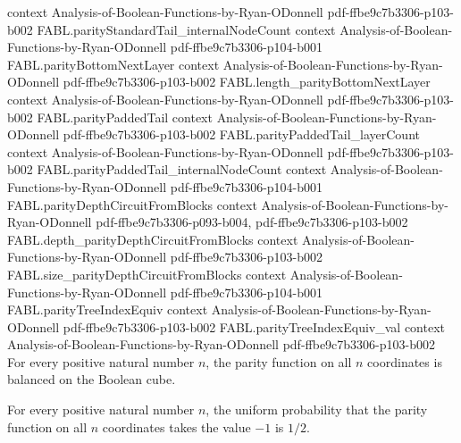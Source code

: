 \begin{theorem}
  {context}
  {Analysis-of-Boolean-Functions-by-Ryan-ODonnell}
  {pdf-ffbe9c7b3306-p103-b002}
\proofstep
  {FABL.parityStandardTail_internalNodeCount}
  {context}
  {Analysis-of-Boolean-Functions-by-Ryan-ODonnell}
  {pdf-ffbe9c7b3306-p104-b001}
\proofstep
  {FABL.parityBottomNextLayer}
  {context}
  {Analysis-of-Boolean-Functions-by-Ryan-ODonnell}
  {pdf-ffbe9c7b3306-p103-b002}
\proofstep
  {FABL.length_parityBottomNextLayer}
  {context}
  {Analysis-of-Boolean-Functions-by-Ryan-ODonnell}
  {pdf-ffbe9c7b3306-p103-b002}
\proofstep
  {FABL.parityPaddedTail}
  {context}
  {Analysis-of-Boolean-Functions-by-Ryan-ODonnell}
  {pdf-ffbe9c7b3306-p103-b002}
\proofstep
  {FABL.parityPaddedTail_layerCount}
  {context}
  {Analysis-of-Boolean-Functions-by-Ryan-ODonnell}
  {pdf-ffbe9c7b3306-p103-b002}
\proofstep
  {FABL.parityPaddedTail_internalNodeCount}
  {context}
  {Analysis-of-Boolean-Functions-by-Ryan-ODonnell}
  {pdf-ffbe9c7b3306-p104-b001}
\proofstep
  {FABL.parityDepthCircuitFromBlocks}
  {context}
  {Analysis-of-Boolean-Functions-by-Ryan-ODonnell}
  {pdf-ffbe9c7b3306-p093-b004,
    pdf-ffbe9c7b3306-p103-b002}
\proofstep
  {FABL.depth_parityDepthCircuitFromBlocks}
  {context}
  {Analysis-of-Boolean-Functions-by-Ryan-ODonnell}
  {pdf-ffbe9c7b3306-p103-b002}
\proofstep
  {FABL.size_parityDepthCircuitFromBlocks}
  {context}
  {Analysis-of-Boolean-Functions-by-Ryan-ODonnell}
  {pdf-ffbe9c7b3306-p104-b001}
\proofstep
  {FABL.parityTreeIndexEquiv}
  {context}
  {Analysis-of-Boolean-Functions-by-Ryan-ODonnell}
  {pdf-ffbe9c7b3306-p103-b002}
\proofstep
  {FABL.parityTreeIndexEquiv_val}
  {context}
  {Analysis-of-Boolean-Functions-by-Ryan-ODonnell}
  {pdf-ffbe9c7b3306-p103-b002}
For every positive natural number $n$, the parity function on all $n$ coordinates is
balanced on the Boolean cube.
\end{theorem}

\begin{theorem}
\label{FABL.parityFunction_univ_neg_one_probability}
\leanok
{}
For every positive natural number $n$, the uniform probability that the parity function
on all $n$ coordinates takes the value $-1$ is $1/2$.
\end{theorem}

